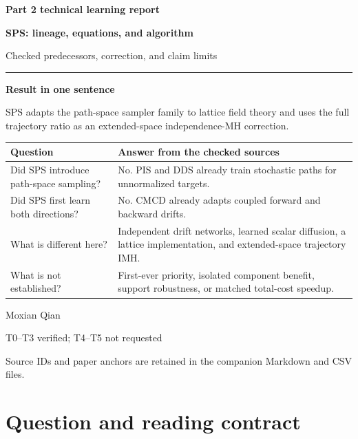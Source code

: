 \documentclass[10pt]{article}
\begin{document}
\hypersetup{pageanchor=false}

\begin{titlepage}
\color{ink}
\vspace*{1.1cm}
{\Large\textbf{Part 2 technical learning report}\par}
\vspace{8mm}
{\huge\textbf{SPS: lineage, equations, and algorithm}\par}
\vspace{4mm}
{\Large Checked predecessors, correction, and claim limits\par}
\vspace{14mm}
\rule{\linewidth}{1.1pt}
\vspace{7mm}

{\large\textbf{Result in one sentence}\par}
\vspace{2mm}
SPS adapts the path-space sampler family to lattice field theory and uses
the full trajectory ratio as an extended-space independence-MH correction.

\vspace{8mm}
\begin{tabularx}{\linewidth}{@{}P{3.6cm}Y@{}}
\toprule
Question & Answer from the checked sources \\
\midrule
Did SPS introduce path-space sampling? & No. PIS and DDS already train
stochastic paths for unnormalized targets. \\
Did SPS first learn both directions? & No. CMCD already adapts coupled
forward and backward drifts. \\
What is different here? & Independent drift networks, learned scalar
diffusion, a lattice implementation, and extended-space trajectory IMH. \\
What is not established? & First-ever priority, isolated component benefit,
support robustness, or matched total-cost speedup. \\
\bottomrule
\end{tabularx}

\vfill
{\large Moxian Qian\par}
{\normalsize T0--T3 verified; T4--T5 not requested\par}
\vspace{2mm}
{\small Source IDs and paper anchors are retained in the companion Markdown
and CSV files.\par}
\end{titlepage}
\hypersetup{pageanchor=true}

\section{Question and reading contract}
\end{document}
